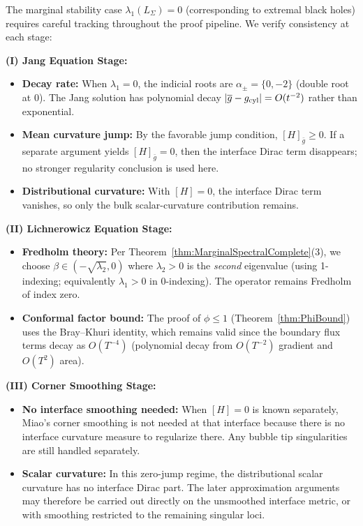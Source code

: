 \begin{remark}[Marginal Stability Consistency Verification: $\lambda_1 = 0$ Throughout Pipeline]\label{rem:MarginalStabilityConsistency}
The marginal stability case $\lambda_1(L_\Sigma) = 0$ (corresponding to extremal black holes) requires careful tracking throughout the proof pipeline. We verify consistency at each stage:

\textbf{(I) Jang Equation Stage:}
\begin{itemize}
    \item \textbf{Decay rate:} When $\lambda_1 = 0$, the indicial roots are $\alpha_\pm = \{0, -2\}$ (double root at 0). The Jang solution has polynomial decay $|\overline{g} - g_{\text{cyl}}| = O(t^{-2})$ rather than exponential.
    \item \textbf{Mean curvature jump:} By the favorable jump condition, $[H]_{\bar{g}} \ge 0$. If a separate argument yields $[H]_{\bar{g}} = 0$, then the interface Dirac term disappears; no stronger regularity conclusion is used here.
    \item \textbf{Distributional curvature:} With $[H] = 0$, the interface Dirac term vanishes, so only the bulk scalar-curvature contribution remains.
\end{itemize}

\textbf{(II) Lichnerowicz Equation Stage:}
\begin{itemize}
    \item \textbf{Fredholm theory:} Per Theorem~\ref{thm:MarginalSpectralComplete}(3), we choose $\beta \in (-\sqrt{\lambda_2}, 0)$ where $\lambda_2 > 0$ is the \emph{second} eigenvalue (using 1-indexing; equivalently $\lambda_1 > 0$ in 0-indexing). The operator remains Fredholm of index zero.
    \item \textbf{Conformal factor bound:} The proof of $\phi \le 1$ (Theorem~\ref{thm:PhiBound}) uses the Bray--Khuri identity, which remains valid since the boundary flux terms decay as $O(T^{-4})$ (polynomial decay from $O(T^{-2})$ gradient and $O(T^2)$ area).
\end{itemize}

\textbf{(III) Corner Smoothing Stage:}
\begin{itemize}
    \item \textbf{No interface smoothing needed:} When $[H] = 0$ is known separately, Miao's corner smoothing is not needed at that interface because there is no interface curvature measure to regularize there. Any bubble tip singularities are still handled separately.
    \item \textbf{Scalar curvature:} In this zero-jump regime, the distributional scalar curvature has no interface Dirac part. The later approximation arguments may therefore be carried out directly on the unsmoothed interface metric, or with smoothing restricted to the remaining singular loci.
\end{itemize}


\end{remark}
